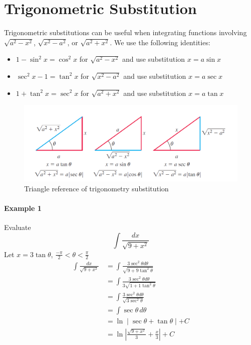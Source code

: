 \documentclass[12pt]{article}
\begin{document}
\section{Trigonometric Substitution}
Trigonometric substitutions can be useful when integrating functions involving $\sqrt{a^2 - x^2}$, $\sqrt{x^2 - a^2}$, or $\sqrt{a^2 + x^2}$.
We use the following identities:
\begin{itemize} 
    \item $1 - \sin^2 x = \cos^2 x$ for $\sqrt{a^2 - x^2}$ and use substitution $x = a\sin x$
    \item $\sec^2 x - 1 = \tan^2 x$ for $\sqrt{x^2 - a^2}$ and use substitution $x = a\sec x$
    \item $1 + \tan^2 x = \sec^2 x$ for $\sqrt{a^2 + x^2}$ and use substitution $x = a\tan x$
\end{itemize}
\begin{figure}[H]
     \centering
     \includegraphics[width = 0.7 \linewidth]{Images/trig substitution.png}
     \caption{Triangle reference of trigonometry substitution}
\end{figure}

\paragraph{Example 1} Evaluate
\[
    \int \frac{dx}{\sqrt{9 + x^2}} 
\]
Let $x = 3 \tan \theta$, $\frac{-\pi}{2} < \theta < \frac{\pi}{2}$
\begin{align*} 
    \int \frac{dx}{\sqrt{9 + x^2}}\, &= \int \frac{3 \sec^2 \theta d\theta}{\sqrt{9 + 9 \tan^2 \theta}} \\
    &= \int \frac{3 \sec^2 \theta d\theta}{3\sqrt{1 + 1 \tan^2 \theta}} \\
    &= \int \frac{3 \sec^2 \theta d\theta}{\sqrt{3\sec^2 \theta}} \\
    &= \int \sec \theta\, d\theta \\
    &= \ln \mid \sec \theta + \tan \theta \mid + C \\
    &= \ln \left| \frac{\sqrt{9 + x^2}}{3} + \frac{x}{3} \right| + C 
\end{align*}
\end{document}
